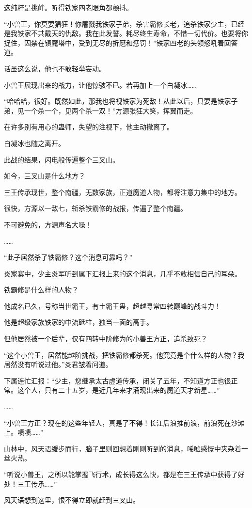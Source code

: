 \begin{this_body}
这纯粹是挑衅。听得铁家四老眼角都颤抖。

“小兽王，你莫要猖狂！你屠戮我铁家子弟，杀害霸修长老，追杀铁家少主，已经是我铁家不共戴天的仇敌。我在此发誓。耗尽终生寿命，不惜一切代价。也要将你捉住，囚禁在镇魔塔中，受到无尽的折磨和惩罚！”铁家四老的头领怒吼着回答道。

话虽这么说，他也不敢轻举妄动。

小兽王展现出来的战力，让他惊骇不已。若再加上一个白凝冰……

“哈哈哈，很好。既然如此，那我也将视铁家为死敌！从此以后，只要是铁家子弟，见一个杀一个，见两个杀一双！”方源张狂大笑，挥翼而走。

在许多别有用心的蛊师，失望的注视下，他主动撤离了。

白凝冰也随之离开。

此战的结果，闪电般传遍整个三叉山。

如今，三叉山是什么地方？

三王传承现世，整个南疆，无数家族，正道魔道人物，都将注意力集中的地方。

很快，方源以一敌七，斩杀铁霸修的战报，传遍了整个南疆。

不可避免的，方源声名大噪！

……

“此子居然杀了铁霸修？这个消息可靠吗？”

炎家寨中，少主炎军听到属下汇报上来的这个消息，几乎不敢相信自己的耳朵。

铁霸修是什么样的人物？

他成名已久，号称当世霸王，有土霸王蛊，超越寻常四转巅峰的战斗力！

他是超级家族铁家的中流砥柱，独当一面的高手。

但他居然被一个后辈，仅有四转中阶修为的小兽王方正，追杀致死？

“这个小兽王，居然能越阶挑战，把铁霸修都杀死。他究竟是个什么样的人物？我居然没有听说过他。”炎君皱着问道。

下属连忙汇报：“少主，您继承太古虚道传承，闭关了五年，不知道方正也很正常。这个人，只有二十五岁，是近几年来才涌现出来的魔道天才新星……”

……

“小兽王方正？现在的这些年轻人，真是了不得！长江后浪推前浪，前浪死在沙滩上。啧啧……”

山林中，风天语缓步而行，脑子里则回想着刚刚听到的消息，唏嘘感慨中夹杂着一丝火热。

“听说小兽王，之所以能掌握飞行术，成长得这么快，都是在三王传承中获得了好处！三王传承……”

风天语想到这里，恨不得立即就赶到三叉山。


\end{this_body}
